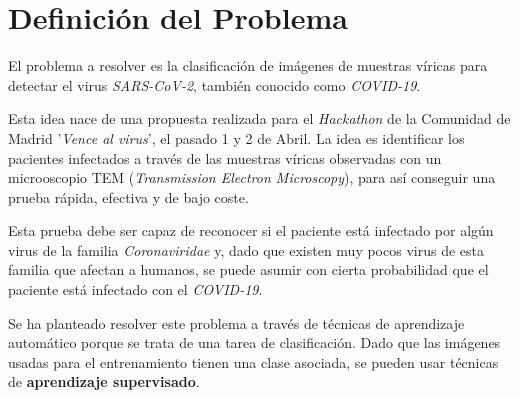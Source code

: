 \documentclass{uc3mpracticas}
\begin{document}
  \frontmatter



  \vspace{40mm}


  \newpage


  \tableofcontents

  \listoffigures
  \newpage

  \mainmatter


  \section{Definición del Problema}

  El problema a resolver es la clasificación de imágenes de muestras víricas para detectar el virus \textit{SARS-CoV-2}, también conocido como \textit{COVID-19}.

  \vspace{2mm}

  Esta idea nace de una propuesta realizada para el \textit{Hackathon} de la Comunidad de Madrid '\textit{Vence al virus}', el pasado 1 y 2 de Abril. La idea es identificar los pacientes infectados a través de las muestras víricas observadas con un microoscopio TEM (\textit{Transmission Electron Microscopy}), para así conseguir una prueba rápida, efectiva y de bajo coste.

  \vspace{2mm}

  Esta prueba debe ser capaz de reconocer si el paciente está infectado por algún virus de la familia \textit{Coronaviridae} y, dado que existen muy pocos virus de esta familia que afectan a humanos, se puede asumir con cierta probabilidad que el paciente está infectado con el \textit{COVID-19}.

  \vspace{3mm}

  Se ha planteado resolver este problema a través de técnicas de aprendizaje automático porque se trata de una tarea de clasificación. Dado que las imágenes usadas para el entrenamiento tienen una clase asociada, se pueden usar técnicas de \textbf{aprendizaje supervisado}.
  \vspace{2mm}
\end{document}
